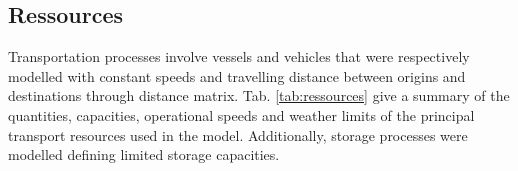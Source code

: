 \subsection{Ressources}
Transportation processes involve vessels and vehicles that were respectively modelled with constant speeds and travelling distance between origins and destinations through distance matrix. Tab. \ref{tab:ressources} give a summary of the quantities, capacities, operational speeds and weather limits of the principal transport resources used in the model. Additionally, storage processes were modelled defining limited storage capacities.